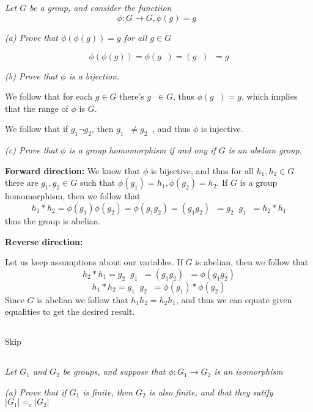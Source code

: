 \documentclass[11pt,oneside,titlepage]{book}
\DeclareMathOperator \inv {^{-1}}
\begin{document}
\subsection{}

\textit{Let $G$ be a group, and consider the functiion
  $$\phi: G \to G, \phi(g) = g\inv$$
}

\textit{(a) Prove that $\phi(\phi(g)) = g$ for all $g \in G$}

$$\phi(\phi(g)) = \phi(g\inv) = (g\inv)\inv = g$$

\textit{(b) Prove that $\phi$ is a bijection.}

We follow that for each $g \in G$ there's $g\inv \in G$, thus
$\phi(g\inv) = g$, which implies that the range of $\phi$ is $G$.

We follow that if $g_1 \neg g_2$, then $g_1\inv \neq g_2\inv$, and thus
$\phi$ is injective.

\textit{(c) Prove that $\phi$ is a group homomorphism if and ony if
  $G$ is an abelian group.}

\textbf{Forward direction:}
We know that $\phi$ is bijective, and thus for all $h_1, h_2 \in G$
there are $g_1, g_2 \in G$ such that $\phi(g_1) = h_1, \phi(g_2) =
h_2$. If $G$ is a group homomorphism, then we follow that
$$h_1 * h_2 = \phi(g_1) \phi(g_2) = \phi(g_1 g_2) = (g_1 g_2)\inv = g_2\inv g_1 \inv = h_2 * h_1$$
thus the group is abelian.

\textbf{Reverse direction:}

Let us keep assumptions about our variables. If $G$ is abelian, then
we follow that
$$h_2 * h_1 = g_2\inv g_1 \inv  =  (g_1 g_2)\inv  = \phi(g_1 g_2)$$
$$h_1 * h_2 = g_1\inv g_2 \inv  =  \phi(g_1) * \phi(g_2)$$
Since $G$ is abelian we follow that $h_1 h_2 = h_2 h_1$, and thus
we can equate given equalities to get the desired result.

\subsection{}

Skip

\subsection{}

\textit{Let $G_1$ and $G_2$ be groups, and suppose that $\phi: G_1 \to
  G_2$ is an isomorphism}

\textit{(a) Prove that if $G_1$ is finite, then $G_2$ is also finite, and
  that they satify $|G_1| =_c |G_2|$}
\end{document}
